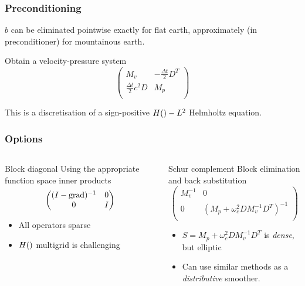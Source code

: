 \documentclass[presentation]{beamer}
\DeclareMathOperator{\grad}{grad}
\let\div\relax
\DeclareMathOperator{\div}{div}
\begin{document}
\begin{frame}
  \frametitle{Preconditioning}
  $b$ can be eliminated pointwise exactly for flat earth,
  approximately (in preconditioner) for mountainous earth.

  Obtain a velocity-pressure system
\begin{equation*}
\begin{pmatrix}
  M_v & -\frac{\Delta t}{2}D^T\\
  \frac{\Delta t}{2}c^2D & M_p\\
\end{pmatrix}
\end{equation*}

This is a discretisation of a sign-positive $H(\div)-L^2$ Helmholtz
equation.
\end{frame}

\begin{frame}[t]
  \frametitle{Options}
  \begin{columns}
    \begin{column}{0.52\textwidth}
      \begin{block}{Block diagonal}
        Using the appropriate function space inner products
        \begin{equation*}
          \begin{pmatrix}
            (I - \grad \div)^{-1} & 0 \\
            0 & I\\
          \end{pmatrix}
        \end{equation*}
      \end{block}
      \begin{itemize}
      \item All operators sparse
      \item $H(\div)$ multigrid \parencite{Arnold:2000} is challenging
      \end{itemize}
    \end{column}
    \begin{column}{0.52\textwidth}
      \begin{block}{Schur complement}
        Block elimination and back substitution
        \begin{equation*}
          \begin{pmatrix}
            M_v^{-1} & 0 \\
            0 & (M_p + \omega_c^2 D M_v^{-1} D^T)^{-1}\\
          \end{pmatrix}
        \end{equation*}
      \end{block}
      \begin{itemize}
      \item $S = M_p +  \omega_c^2 D M_v^{-1} D^T$ is \emph{dense}, but elliptic
      \item Can use similar methods as a \emph{distributive} smoother.
      \end{itemize}
    \end{column}
  \end{columns}
\end{frame}
\end{document}
